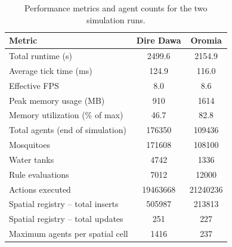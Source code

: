 \documentclass{article}
\begin{document}
\begin{table}[!htb]
\centering
\caption{Performance metrics and agent counts for the two simulation runs.}
\label{tab:performance}
\begin{tabular}{l S[table-format=8.1] S[table-format=8.1]}
\toprule
Metric & {Dire Dawa} & {Oromia} \\ \midrule
Total runtime (s) & 2499.6 & 2154.9 \\
Average tick time (ms) & 124.9 & 116.0 \\
Effective FPS & 8.0 & 8.6 \\
Peak memory usage (MB) & 910 & 1614 \\
Memory utilization (\% of max) & 46.7 & 82.8 \\
Total agents (end of simulation) & 176350 & 109436 \\
\quad Mosquitoes & 171608 & 108100 \\
\quad Water tanks & 4742 & 1336 \\
Rule evaluations & 7012 & 12000 \\
Actions executed & 19463668 & 21240236 \\
Spatial registry -- total inserts & 505987 & 213813 \\
Spatial registry -- total updates & 251 & 227 \\
Maximum agents per spatial cell & 1416 & 237 \\ \bottomrule
\end{tabular}
\end{table}
\end{document}
